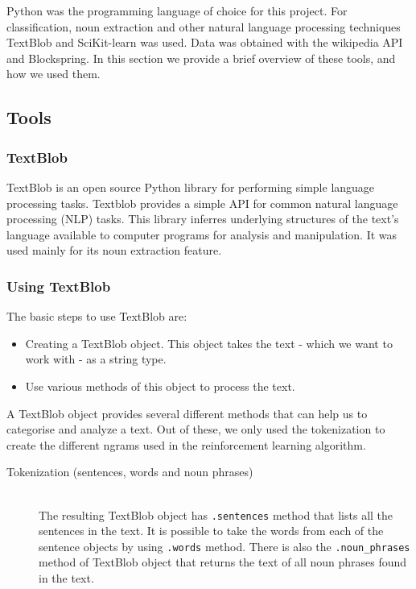 \documentclass[a4paper,10pt]{article}
\begin{document}
\noindent Python was the programming language of choice for this project. For classification, noun extraction and other natural language processing techniques TextBlob and SciKit-learn was used. Data was obtained with the wikipedia API and Blockspring. In this section we provide a brief overview of these tools, and how we used them.

\subsection{Tools}  
\subsubsection{TextBlob}

TextBlob is an open source Python library for performing simple language processing tasks. Textblob provides a simple API for common natural language processing (NLP) tasks. This library inferres underlying structures of the text's language available to computer programs for analysis and manipulation. It was used mainly for its noun extraction feature.

\subsubsection{Using TextBlob}

The basic steps to use TextBlob are:

\begin{itemize}  
\item Creating a TextBlob object. This object takes the text - which we want to work with - as a string type.
\item Use various methods of this object to process the text.
\end{itemize}

A TextBlob object provides several different methods that can help us to categorise and analyze a text. Out of these, we only used the tokenization to create the different ngrams used in the reinforcement learning algorithm. 

\begin{description}
  \item[Tokenization (sentences, words and noun phrases)] \hfill \\
  The resulting TextBlob object has \texttt{.sentences} method that lists all the sentences in the text. It is possible to take the words from each of the sentence objects by using \texttt{.words} method. There is also the \texttt{.noun\_phrases} method of TextBlob object that returns the text of all noun phrases found in the text.
 
\end{description}
\end{document}
